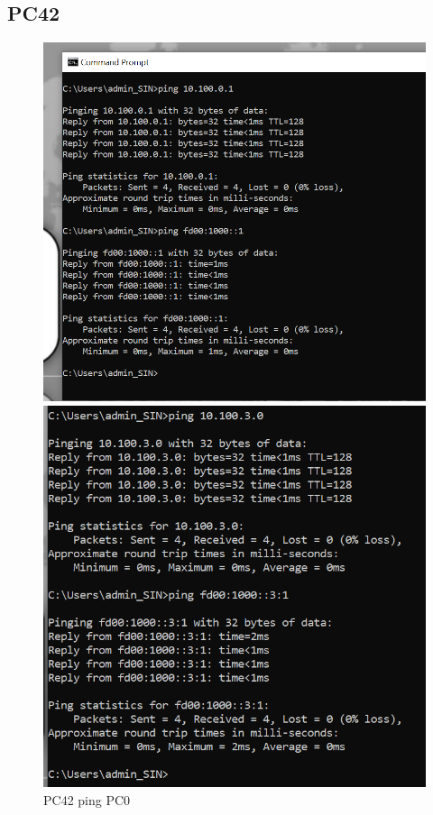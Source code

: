 \documentclass{article}
\begin{document}
\subsection{PC42}
\begin{figure}[!htp]
  \centering
  \begin{minipage}[b]{0.3\textwidth}
    \includegraphics[width=\textwidth]{Arbeitsergebnisse/PC41/pc41_ping_pc0.png}
    \caption{PC42 ping PC0}
  \end{minipage}
  \hspace{0.8cm}
  \begin{minipage}[b]{0.3\textwidth}
    \includegraphics[width=\textwidth]{Arbeitsergebnisse/PC41/pc41_ping_net3.png}

\end{minipage}
\end{figure}
\end{document}
